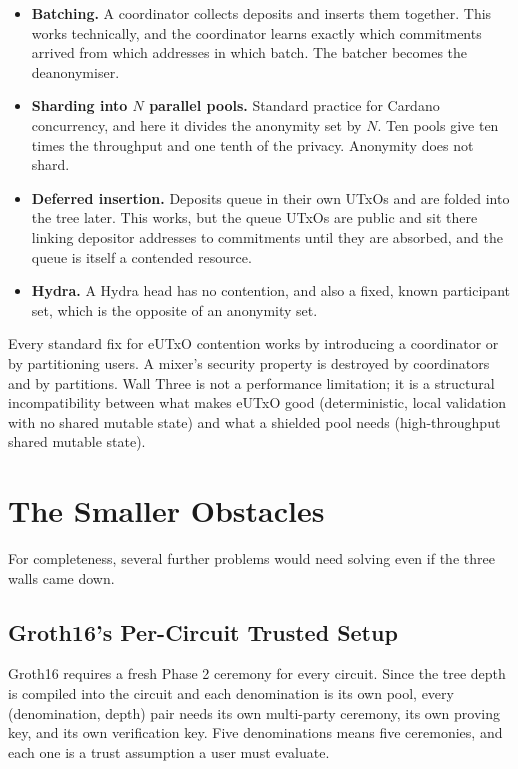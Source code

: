 \begin{itemize}
  \item \textbf{Batching.} A coordinator collects deposits and inserts them
        together. This works technically, and the coordinator learns exactly
        which commitments arrived from which addresses in which batch. The
        batcher becomes the deanonymiser.
  \item \textbf{Sharding into $N$ parallel pools.} Standard practice for
        Cardano concurrency, and here it divides the anonymity set by $N$. Ten
        pools give ten times the throughput and one tenth of the privacy.
        Anonymity does not shard.
  \item \textbf{Deferred insertion.} Deposits queue in their own UTxOs and are
        folded into the tree later. This works, but the queue UTxOs are public
        and sit there linking depositor addresses to commitments until they are
        absorbed, and the queue is itself a contended resource.
  \item \textbf{Hydra.} A Hydra head has no contention, and also a fixed,
        known participant set, which is the opposite of an anonymity set.
\end{itemize}

\begin{highlight}
Every standard fix for eUTxO contention works by introducing a coordinator or by
partitioning users. A mixer's security property is destroyed by coordinators and
by partitions. Wall Three is not a performance limitation; it is a structural
incompatibility between what makes eUTxO good (deterministic, local validation
with no shared mutable state) and what a shielded pool needs (high-throughput
shared mutable state).
\end{highlight}

\section{The Smaller Obstacles} \label{sec:ch8-smaller}

For completeness, several further problems would need solving even if the three
walls came down.

\subsection*{Groth16's Per-Circuit Trusted Setup}

Groth16 requires a fresh Phase 2 ceremony for every circuit. Since the tree
depth is compiled into the circuit and each denomination is its own pool, every
(denomination, depth) pair needs its own multi-party ceremony, its own proving
key, and its own verification key. Five denominations means five ceremonies, and
each one is a trust assumption a user must evaluate.

